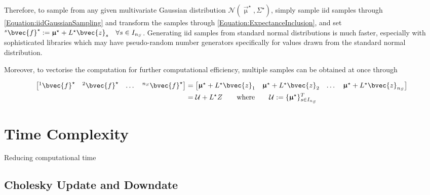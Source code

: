 			Therefore, to sample from any given multivariate Gaussian distribution $\mathcal{N}(\vec{\upmu}^{\star}, \Sigma^{\star})$, simply sample iid samples through \eqref{Equation:iidGaussianSampling} and transform the samples through \eqref{Equation:ExpectanceInclusion}, and set ${^{s}}\bvec{f}^{\star} := \vec{\upmu}^{\star} + L^{\star} \bvec{z}_{s} \quad \forall s \in I_{n_{S}}$. Generating iid samples from standard normal distributions is much faster, especially with sophisticated libraries which may have pseudo-random number generators specifically for values drawn from the standard normal distribution.
			
			Moreover, to vectorise the computation for further computational efficiency, multiple samples can be obtained at once through 
			
			\begin{equation}
				\begin{aligned}
					\begin{bmatrix} {^{1}}\bvec{f}^{\star} & {^{2}}\bvec{f}^{\star} & \dots & {^{n_{S}}}\bvec{f}^{\star} \end{bmatrix} &= \begin{bmatrix} \vec{\upmu}^{\star} + L^{\star} \bvec{z}_{1} & \vec{\upmu}^{\star} + L^{\star} \bvec{z}_{2} & \dots & \vec{\upmu}^{\star} + L^{\star} \bvec{z}_{n_{S}} \end{bmatrix} \\
					&= \mathcal{U} + L^{\star} Z \qquad \text{where} \qquad \mathcal{U} := \{\vec{\upmu}^{\star}\}^{T}_{s \in I_{n_{S}}}
				\end{aligned}
			\label{Equation:VectorisedSampling}
			\end{equation}			
			
	\section{Time Complexity}
	\label{Appendix:ComputationalAspects:TimeComplexity}
	
		Reducing computational time
		
		
		\subsection{Cholesky Update and Downdate}
		\label{Appendix:ComputationalAspects:TimeComplexity:CholeskyUpdateDowndate}
		
